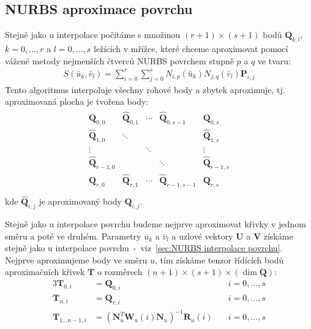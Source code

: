 \subsection{NURBS aproximace povrchu\label{section:aproximace povrchu}}
Stejně jako u interpolace počítáme s množinou $(r + 1)\times(s + 1)$ bodů
$\bm{Q}_{k,l}$, $k=0,\ldots, r$ a $l = 0, \ldots, s$ ležících v mřížce, které chceme aproximovat
pomocí vážené metody nejmenších čtverců NURBS povrchem stupně $p$ a $q$ ve
tvaru:
\begin{align}
    S(\bar{u}_k, \bar{v}_l) = \sum_{i=0}^{r}\sum_{j=0}^{s}N_{i,p}(\bar{u}_k)N_{j,q}(\bar{v}_l)\bm{P}_{i,j}
\end{align}
Tento algoritmus interpoluje všechny rohové body a zbytek aproximuje, tj. aproximovaná plocha je tvořena body:
\begin{align}
    \begin{matrix}
        \bm{Q}_{0, 0}         & \hat{\bm{Q}}_{0, 1} & \cdots & \hat{\bm{Q}}_{0, s-1}   & \bm{Q}_{0, s}         \\
        \hat{\bm{Q}}_{1, 0}   & \ddots              &        &                         & \hat{\bm{Q}}_{1, s}   \\
        \vdots                &                     & \ddots &                         & \vdots                \\
        \hat{\bm{Q}}_{r-1, 0} &                     &        & \ddots                  & \hat{\bm{Q}}_{r-1, s} \\
        \bm{Q}_{r, 0}         & \hat{\bm{Q}}_{r, 1} & \cdots & \hat{\bm{Q}}_{r-1, s-1} & \bm{Q}_{r,s}          \\
    \end{matrix}
\end{align}
kde $\hat{\bm{Q}}_{i,j}$ je aproximovaný body $\bm{Q}_{i,j}$.\par
Stejně jako u interpolace povrchu budeme nejprve aproximovat křivky
v jednom směru a poté ve druhém. Parametry $\bar{u}_k$ a $\bar{v}_l$ a uzlové
vektory $\bm{U}$ a $\bm{V}$ získáme stejně jako
u interpolace povrchu~-~viz~\ref{sec:NURBS interpolace povrchu}.
Nejprve aproximujeme body ve směru $u$, tím získáme tenzor řídících
bodů aproximačních křivek $\bm{T}$ o rozměrech $(n + 1) \times (s + 1) \times (\dim{\bm{Q}})$:
\begin{alignat}{3}
    \bm{T}_{0, i}              & = \bm{Q}_{0, i}                                   & \quad i = 0, \ldots, s \\
    \bm{T}_{n, i}              & = \bm{Q}_{r, i}                                   & \quad i = 0, \ldots, s \\
    \bm{T}_{1 \ldots n - 1, i} & = (\bm{N}_u^T\bm{W}_u(i)\bm{N}_u)^{-1}\bm{R}_u(i) & \quad i = 0, \ldots, s
\end{alignat}
